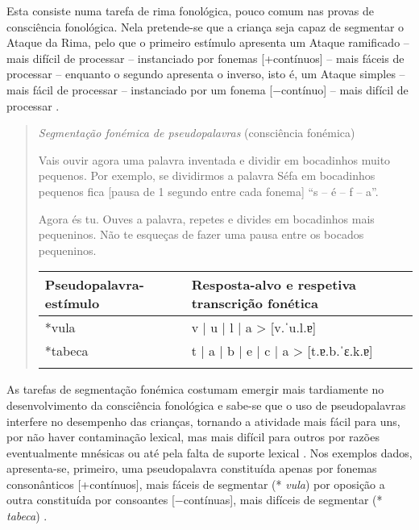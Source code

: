 \documentclass[output=paper,colorlinks,citecolor=brown,booklanguage=portuguese]{langscibook}
\begin{document}
Esta consiste numa tarefa de rima fonológica, pouco comum nas provas de consciência fonológica. Nela pretende-se que a criança seja capaz de segmentar o Ataque da Rima, pelo que o primeiro estímulo apresenta um Ataque ramificado -- mais difícil de processar \citep{Afonso2015} -- instanciado por fonemas [+contínuos] -- mais fáceis de processar \citep{Alves2012} -- enquanto o segundo apresenta o inverso, isto é, um Ataque simples -- mais fácil de processar \citep{Afonso2015} -- instanciado por um fonema [$-$contínuo] -- mais difícil de processar \citep{Alves2012}.

\begin{quote}
\textit{Segmentação fonémica de pseudopalavras} (consciência fonémica) 

Vais ouvir agora uma palavra inventada e dividir em bocadinhos muito pequenos. Por exemplo, se dividirmos a palavra Séfa em bocadinhos pequenos fica [pausa de 1 segundo entre cada fonema] “s – é – f – a”.

Agora és tu. Ouves a palavra, repetes e divides em bocadinhos mais pequeninos. Não te esqueças de fazer uma pausa entre os bocados pequeninos.



\begin{Tabela}
\begin{tabularx}{\textwidth}{Xl}
\lsptoprule
\textbf{Pseudopalavra-}\textbf{estímulo} & \textbf{Resposta-alvo e respetiva }\textbf{transcrição fonética}\\
\midrule
*vula & v | u | l | a  >  [v.ˈu.l.ɐ]\\
*tabeca & t | a | b | e | c | a  >  [t.ɐ.b.ˈɛ.k.ɐ]\\
\lspbottomrule
\end{tabularx}
\end{Tabela}
\end{quote}


As tarefas de segmentação fonémica costumam emergir mais tardiamente no desenvolvimento da consciência fonológica e sabe-se que o uso de pseudopalavras interfere no desempenho das crianças, tornando a atividade mais fácil para uns, por não haver contaminação lexical, mas mais difícil para outros por razões eventualmente mnésicas ou até pela falta de suporte lexical \citep{Alves2012}.
Nos exemplos dados, apresenta-se, primeiro, uma pseudopalavra constituída apenas por fonemas consonânticos [+contínuos], mais fáceis de segmentar (* \emph{vula}) por oposição a outra constituída por consoantes [$-$contínuas], mais difíceis de segmentar (* \emph{tabeca}) \citep{Alves2012}.
\end{document}
